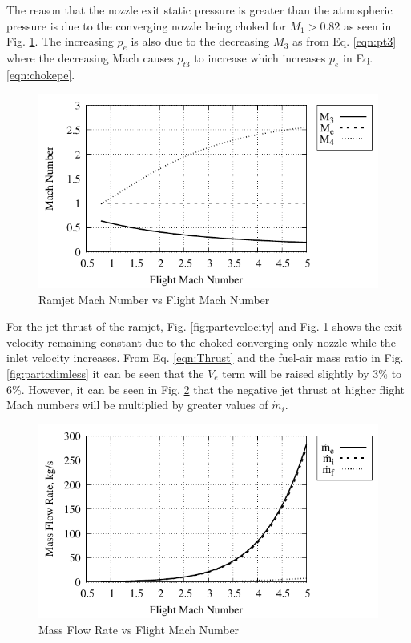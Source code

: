 \documentclass[conf]{new-aiaa} %
\begin{document}
The reason that the nozzle exit static pressure is greater than the atmospheric pressure is due to the converging nozzle being choked for $M_1>0.82$ as seen in Fig. \ref{fig:partcmach}. The increasing $p_e$ is also due to the decreasing $M_3$ as from Eq. \ref{eqn:pt3} where the decreasing Mach causes $p_{t3}$ to increase which increases $p_e$ in Eq. \ref{eqn:chokepe}.

\begin{figure}[H] %
    \centering
    \includegraphics[]{media/performance_parameter_files/part_c_mach_number.pdf}
    \caption{\label{fig:partcmach}Ramjet Mach Number vs Flight Mach Number}
\end{figure}

For the jet thrust of the ramjet, Fig. \ref{fig:partcvelocity} and Fig. \ref{fig:partcmach} shows the exit velocity remaining constant due to the choked converging-only nozzle while the inlet velocity increases. From Eq. \ref{eqn:Thrust} and the fuel-air mass ratio in Fig. \ref{fig:partcdimless} it can be seen that the $V_e$ term will be raised slightly by 3\% to 6\%. However, it can be seen in Fig. \ref{fig:partcmass} that the negative jet thrust at higher flight Mach numbers will be multiplied by greater values of $\dot{m}_i$.

\begin{figure}[H] %
    \centering
    \includegraphics[]{media/performance_parameter_files/part_c_mass_flow_rate.pdf}
    \caption{\label{fig:partcmass}Mass Flow Rate vs Flight Mach Number}
\end{figure}
\end{document}
